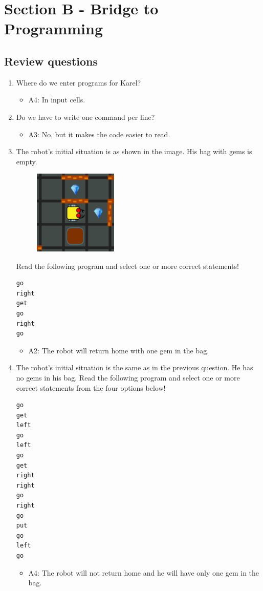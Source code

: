 \documentclass[article,A4,12pt]{llncs}
\begin{document}
\section{Section B - Bridge to Programming}

\subsection{Review questions}

\begin{enumerate}
\item Where do we enter programs for Karel?
  \begin{itemize}
    \item A4: In input cells.
  \end{itemize}
\item Do we have to write one command per line?
  \begin{itemize}
    \item A3: No, but it makes the code easier to read.
  \end{itemize}
\item The robot's initial situation is as shown in the image. His bag with gems is empty. 
\begin{figure}[!ht]
\begin{center}
\includegraphics[width=4cm]{imgk/maze-0.png}
\end{center}
\end{figure}
\noindent
      Read the following program and select one or more correct statements!
\begin{verbatim}
go
right
get
go
right 
go
\end{verbatim}
  \begin{itemize}
    \item A2: The robot will return home with one gem in the bag.
  \end{itemize}
\item The robot's initial situation is the same as in the previous question. He has no gems 
in his bag. Read the following program and select one or more correct statements from the four options below!
\begin{verbatim}
go
get
left
go
left
go
get
right
right
go
right
go
put
go
left 
go
\end{verbatim}
  \begin{itemize}
    \item A4: The robot will not return home and he will have only one gem in the bag.
  \end{itemize}
\end{enumerate}
\end{document}
